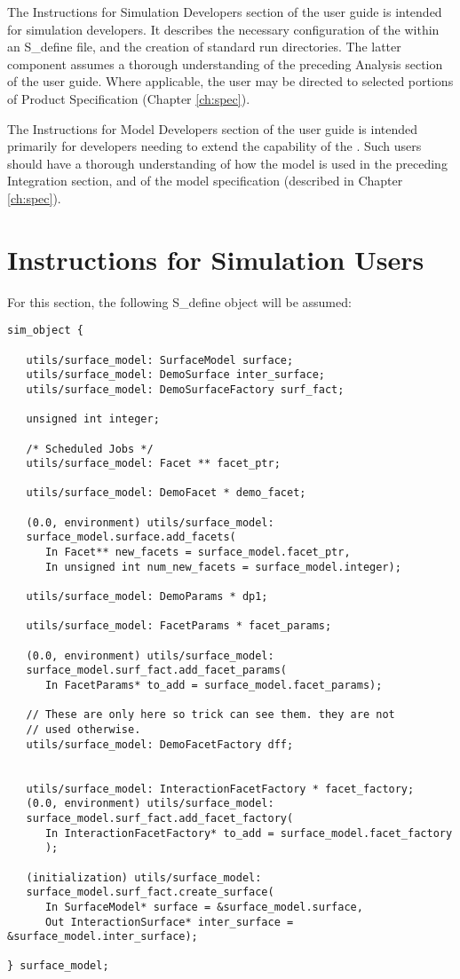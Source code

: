 The Instructions for Simulation Developers section of the user guide is intended for simulation developers.
It describes the necessary configuration of the \ModelDesc within an
S\_define file, and the creation of standard run directories.  The latter
component assumes a thorough understanding of the preceding Analysis section of the user guide.
Where applicable, the user may be directed to selected portions of Product Specification (Chapter \ref{ch:spec}).

The Instructions for Model Developers section of the user guide is intended primarily for developers
needing to extend the capability of the \ModelDesc.  Such users should have a
thorough understanding of how the model is used in the preceding
Integration section, and of the model
specification (described in Chapter \ref{ch:spec}).

\section{Instructions for Simulation Users}

For this section, the following S\_define object will be
assumed:

\begin{verbatim}
sim_object {

   utils/surface_model: SurfaceModel surface;
   utils/surface_model: DemoSurface inter_surface;
   utils/surface_model: DemoSurfaceFactory surf_fact;

   unsigned int integer;

   /* Scheduled Jobs */
   utils/surface_model: Facet ** facet_ptr;

   utils/surface_model: DemoFacet * demo_facet;

   (0.0, environment) utils/surface_model:
   surface_model.surface.add_facets(
      In Facet** new_facets = surface_model.facet_ptr,
      In unsigned int num_new_facets = surface_model.integer);

   utils/surface_model: DemoParams * dp1;

   utils/surface_model: FacetParams * facet_params;

   (0.0, environment) utils/surface_model:
   surface_model.surf_fact.add_facet_params(
      In FacetParams* to_add = surface_model.facet_params);

   // These are only here so trick can see them. they are not
   // used otherwise.
   utils/surface_model: DemoFacetFactory dff;


   utils/surface_model: InteractionFacetFactory * facet_factory;
   (0.0, environment) utils/surface_model:
   surface_model.surf_fact.add_facet_factory(
      In InteractionFacetFactory* to_add = surface_model.facet_factory
      );

   (initialization) utils/surface_model:
   surface_model.surf_fact.create_surface(
      In SurfaceModel* surface = &surface_model.surface,
      Out InteractionSurface* inter_surface = &surface_model.inter_surface);

} surface_model;
\end{verbatim}

